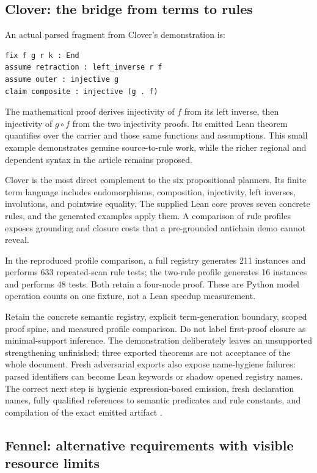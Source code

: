 \documentclass[11pt,letterpaper]{article}
\theoremstyle{definition}\newtheorem{definition}[proposition]{Definition}
\theoremstyle{remark}\newtheorem{remark}[proposition]{Remark}
\begin{document}
\subsection{Clover: the bridge from terms to rules}

An actual parsed fragment from Clover's demonstration is:
\begin{lstlisting}
fix f g r k : End
assume retraction : left_inverse r f
assume outer : injective g
claim composite : injective (g . f)
\end{lstlisting}
The mathematical proof derives injectivity of $f$ from its left inverse,
then injectivity of $g\circ f$ from the two injectivity proofs. Its emitted
Lean theorem quantifies over the carrier and those same functions and
assumptions. This small example demonstrates genuine source-to-rule work,
while the richer regional and dependent syntax in the article remains proposed.

Clover is the most direct complement to the six propositional planners.
Its finite term language includes endomorphisms, composition, injectivity,
left inverses, involutions, and pointwise equality. The supplied Lean core
proves seven concrete rules, and the generated examples apply them. A
comparison of rule profiles exposes grounding and closure costs that a
pre-grounded antichain demo cannot reveal.

In the reproduced profile comparison, a full registry generates 211 instances
and performs 633 repeated-scan rule tests; the two-rule profile generates 16
instances and performs 48 tests. Both retain a four-node proof. These are
Python model operation counts on one fixture, not a Lean speedup measurement.

Retain the concrete semantic registry, explicit term-generation boundary,
scoped proof spine, and measured profile comparison. Do not label first-proof
closure as minimal-support inference. The demonstration deliberately leaves
an unsupported strengthening unfinished; three exported theorems are not
acceptance of the whole document. Fresh adversarial exports also expose
name-hygiene failures: parsed identifiers can become Lean keywords or shadow
opened registry names. The correct next step is hygienic expression-based
emission, fresh declaration names, fully qualified references to semantic
predicates and rule constants, and compilation of the exact emitted
artifact \cite{clover}.

\subsection{Fennel: alternative requirements with visible resource limits}
\end{document}
